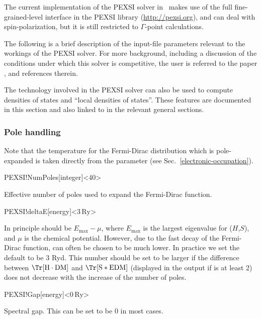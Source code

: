 The current implementation of the PEXSI solver in \siesta\ makes
use of the full fine-grained-level interface in the PEXSI library
(\url{http://pexsi.org}), and can deal with spin-polarization, but it
is still restricted to $\Gamma$-point calculations. 

The following is a brief description of the input-file parameters
relevant to the workings of the PEXSI solver. For more background,
including a discussion of the conditions under which this solver is
competitive, the user is referred to the paper \cite{Lin2014}, and
references therein.

The technology involved in the PEXSI solver can also be used
to compute densities of states and ``local densities of
states''. These features are documented in this section and also
linked to in the relevant general sections.

\subsubsection{Pole handling}

Note that the temperature for the Fermi-Dirac distribution which is
pole-expanded is taken directly from the 
parameter (see Sec.~\ref{electronic-occupation}).

\begin{fdfentry}{PEXSI!NumPoles}[integer]<40>

  Effective number of poles used to expand the Fermi-Dirac function.
  
\end{fdfentry}

\begin{fdfentry}{PEXSI!deltaE}[energy]<$3\,\mathrm{Ry}$>
  
  In principle  should be $E_{\max}-\mu$, where
  $E_{\max}$ is the largest eigenvalue for ($H$,$S$), and $\mu$ is the
  chemical potential. However, due to the fast decay of the
  Fermi-Dirac function,  can often be chosen to be
  much lower.  In practice we set the default to be 3 Ryd.  This
  number should be set to be larger if the difference between
  $\Tr[\mathrm H\cdot\mathrm{DM}]$ and $\Tr[\mathrm S*\mathrm{EDM}]$
  (displayed in the output if  is at least 2)
  does not decrease with the increase of the number of poles.

\end{fdfentry}


\begin{fdfentry}{PEXSI!Gap}[energy]<$0\,\mathrm{Ry}$>

  Spectral gap. This can be set to be 0 in most cases.

\end{fdfentry}


